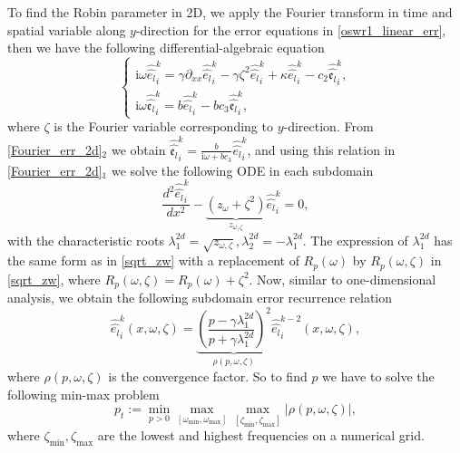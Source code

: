 \documentclass[11pt]{article}
\begin{document}
To find the Robin parameter in 2D, we apply the Fourier transform in time and spatial variable along $y$-direction for the error equations in \eqref{oswr1_linear_err}, then we have the following differential-algebraic equation
\begin{equation}\label{Fourier_err_2d}
\begin{cases}
\mathrm{i}\omega {\widehat{\widehat{e_l}}}_i^{k} = \gamma \partial_{xx} {\widehat{\widehat{e_l}}}_i^{k}-\gamma \zeta^2 {\widehat{\widehat{e_l}}}_i^{k} +\kappa {\widehat{\widehat{e_l}}}_i^{k} -c_2{\widehat{\widehat{\mathfrak{e}_l}}}_i^{k},\\
\mathrm{i}\omega {\widehat{\widehat{\mathfrak{e}_l}}}_i^{k}  = b{\widehat{\widehat{e_l}}}_i^{k} - bc_3{\widehat{\widehat{\mathfrak{e}_l}}}_i^{k},
\end{cases}
\end{equation}
where $\zeta$ is the Fourier variable corresponding to $y$-direction. From \eqref{Fourier_err_2d}$_2$ we obtain ${\widehat{\widehat{\mathfrak{e}_l}}}_i^{k} = \frac{b}{\mathrm{i}\omega + bc_3}{\widehat{\widehat{e_l}}}_i^{k}$, and using this relation in \eqref{Fourier_err_2d}$_1$ we solve the following ODE in each subdomain
\begin{equation}
\frac{d^2 {\widehat{\widehat{e_l}}}_i^{k}} {d x^2} - \underbrace{\left(z_{\omega}+\zeta^2\right)}_{z_{\omega, \zeta}}{\widehat{\widehat{e_l}}}_i^{k}=0,
\end{equation}
with the characteristic roots $\lambda_1^{2d}=\sqrt{z_{\omega, \zeta}}, \lambda_2^{2d}=-\lambda_1^{2d}$. The expression of $\lambda_1^{2d}$ has the same form as in \eqref{sqrt_zw} with a replacement of $R_p(\omega)$ by $R_p(\omega, \zeta)$ in \eqref{sqrt_zw}, where $R_p(\omega, \zeta)=R_p(\omega)+\zeta^2$. Now, similar to one-dimensional analysis, we obtain the following subdomain error recurrence relation
\begin{equation}\label{rec_relation_2d}
{\widehat{\widehat{e_l}}}_i^{k}(x, \omega, \zeta) = \underbrace{\left( \frac{p-\gamma\lambda_1^{2d}}{p+\gamma\lambda_1^{2d}} \right)^2}_{\rho(p, \omega, \zeta)} {\widehat{\widehat{e_l}}}_i^{k-2}(x, \omega, \zeta),
\end{equation}
where $\rho(p, \omega, \zeta)$ is the convergence factor. 
So to find $p$ we have to solve the following min-max problem
\begin{equation}\label{minmax-2d}
p_t:=\min_{p>0}\max_{[\omega_{\min}, \omega_{\max}]} \max_{[\zeta_{\min}, \zeta_{\max}]}\vert \rho(p, \omega, \zeta)\vert,
\end{equation} 
where $\zeta_{\min}, \zeta_{\max}$ are the lowest and highest frequencies on a numerical grid.
\end{document}
